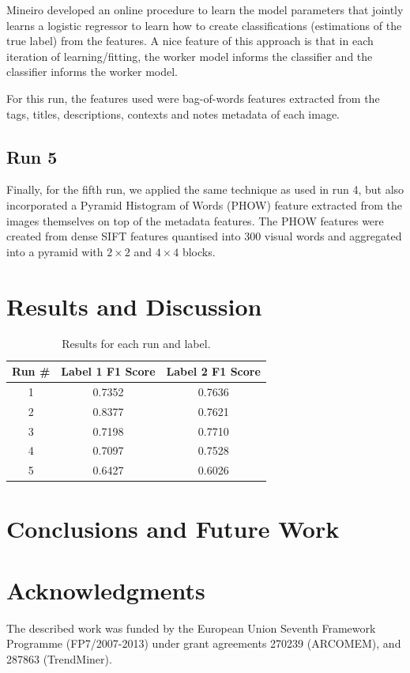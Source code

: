 \documentclass{../acm_proc_article-me11_tweaked}
\begin{document}
Mineiro developed an online procedure to learn the model parameters that jointly learns a logistic regressor to learn how to create classifications (estimations of the true label) from the features. A nice feature of this approach is that in each iteration of learning/fitting, the worker model informs the classifier and the classifier informs the worker model.

For this run, the features used were bag-of-words features extracted from the tags, titles, descriptions, contexts and notes metadata of each image.

\subsection{Run 5}
Finally, for the fifth run, we applied the same technique as used in run 4, but also incorporated a Pyramid Histogram of Words (PHOW) feature extracted from the images themselves on top of the metadata features. The PHOW features were created from dense SIFT features quantised into 300 visual words and aggregated into a pyramid with $2{\times}2$ and $4{\times}4$ blocks.

\section{Results and Discussion}

\begin{table}
	\centering
	\caption{\label{tab:results}Results for each run and label.}
	\begin{tabular}{|c|c|c|}
		\hline
		Run \# & Label 1 F1 Score & Label 2 F1 Score \\ \hline \hline
		1 & 0.7352 & 0.7636 \\ \hline
		2 & 0.8377 & 0.7621 \\ \hline
		3 & 0.7198 & 0.7710 \\ \hline
		4 & 0.7097 & 0.7528 \\ \hline
		5 & 0.6427 & 0.6026 \\ \hline
	\end{tabular}
\end{table}


\section{Conclusions and Future Work}

\section{Acknowledgments}
The described work was funded by the European Union Seventh Framework Programme (FP7/2007-2013) under grant agreements 270239 (ARCOMEM), and 287863 (TrendMiner).



\end{document}
